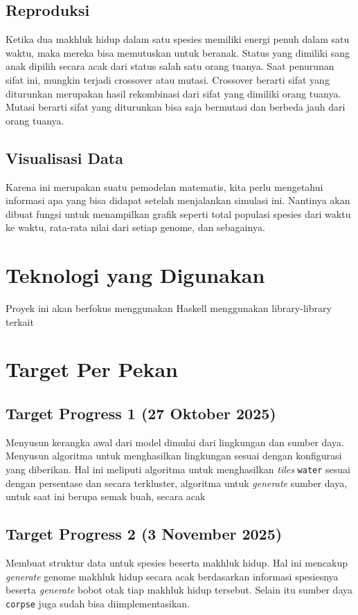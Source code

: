 \documentclass[12pt]{article}
\begin{document}
\subsection{Reproduksi}
Ketika dua makhluk hidup dalam satu spesies memiliki energi penuh dalam satu waktu, maka mereka bisa memutuskan untuk beranak. Status yang dimiliki sang anak dipilih secara acak dari status salah satu orang tuanya. Saat penurunan sifat ini, mungkin terjadi crossover atau mutasi. Crossover berarti sifat yang diturunkan merupakan hasil rekombinasi dari sifat yang dimiliki orang tuanya. Mutasi berarti sifat yang diturunkan bisa saja bermutasi dan berbeda jauh dari orang tuanya.
\subsection{Visualisasi Data}
Karena ini merupakan suatu pemodelan matematis, kita perlu mengetahui informasi apa yang bisa didapat setelah menjalankan simulasi ini. Nantinya akan dibuat fungsi untuk menampilkan grafik seperti total populasi spesies dari waktu ke waktu, rata-rata nilai dari setiap genome, dan sebagainya.
\section{Teknologi yang Digunakan}
Proyek ini akan berfokus menggunakan Haskell menggunakan library-library terkait
\section{Target Per Pekan}
\subsection{Target Progress 1 (27 Oktober 2025)}
Menyusun kerangka awal dari model dimulai dari lingkungan dan sumber daya. Menyusun algoritma untuk menghasilkan lingkungan sesuai dengan konfigurasi yang diberikan. Hal ini meliputi algoritma untuk menghasilkan \textit{tiles} \texttt{water} sesuai dengan persentase dan secara terkluster, algoritma untuk \textit{generate} sumber daya, untuk saat ini berupa semak buah, secara acak
\subsection{Target Progress 2 (3 November 2025)}
Membuat struktur data untuk spesies beserta makhluk hidup. Hal ini mencakup \textit{generate} genome makhluk hidup secara acak berdasarkan informasi spesiesnya beserta \textit{generate} bobot otak tiap makhluk hidup tersebut. Selain itu sumber daya \texttt{corpse} juga sudah bisa diimplementasikan.
\end{document}
